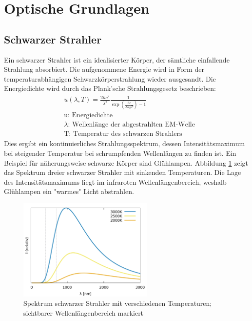 
\section{Optische Grundlagen}

\subsection*{Schwarzer Strahler}
Ein schwarzer Strahler ist ein idealisierter Körper, der sämtliche einfallende Strahlung absorbiert. Die aufgenommene Energie wird in Form der temperaturabhängigen Schwarzkörperstrahlung wieder ausgesandt. Die Energiedichte wird durch das Plank'sche Strahlungsgesetz beschrieben:
	\begin{align*} 
		&u(\lambda,T) = \frac{2 h c^2}{\lambda^5} \frac{1}{\exp(\frac{hc}{\lambda k_B T}) -1}\\
		&\text{u: Energiedichte}\\
		&\lambda \text{: Wellenlänge der abgestrahlten EM-Welle}\\
		&\text{T: Temperatur des schwarzen Strahlers}
	\end{align*}
Dies ergibt ein kontinuierliches Strahlungsspektrum, dessen Intensitätsmaximum bei steigender Temperatur bei schrumpfenden Wellenlängen zu finden ist. Ein Beispiel für näherungsweise schwarze Körper sind Glühlampen. Abbildung \ref{blbody} zeigt das Spektrum dreier schwarzer Strahler mit sinkenden Temperaturen. Die Lage des Intensitätsmaximums liegt im infraroten Wellenlängenbereich, weshalb Glühlampen ein "warmes" Licht abstrahlen. 
	\begin{figure}[htb]
		\centering
		\includegraphics[width=0.6\textwidth]{Abb/blackbody.pdf}
		\caption{Spektrum schwarzer Strahler mit verschiedenen Temperaturen; sichtbarer Wellenlängenbereich markiert}
		\label{blbody}
	\end{figure}

